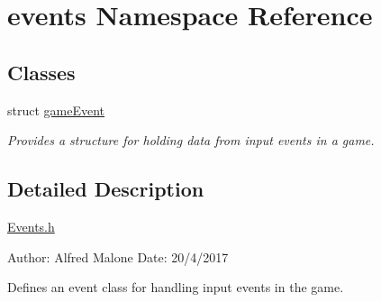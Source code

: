 \hypertarget{namespaceevents}{}\section{events Namespace Reference}
\label{namespaceevents}
\subsection*{Classes}
\begin{DoxyCompactItemize}
\item 
struct \hyperlink{structevents_1_1game_event}{game\+Event}
\begin{DoxyCompactList}\small\item\em Provides a structure for holding data from input events in a game. \end{DoxyCompactList}\end{DoxyCompactItemize}


\subsection{Detailed Description}
\hyperlink{events_8h}{Events.\+h}

Author\+: Alfred Malone Date\+: 20/4/2017

Defines an event class for handling input events in the game. 